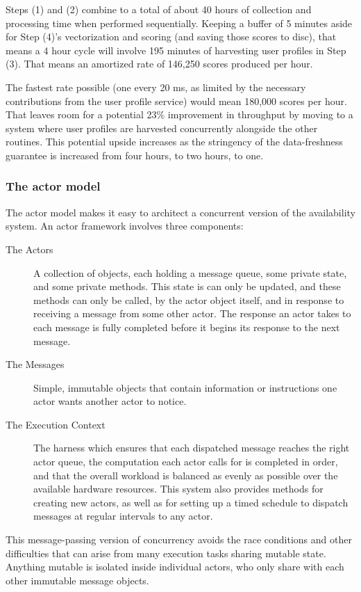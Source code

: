 \documentclass{article}
\begin{document}
 Steps (1) and (2) combine to a total of about 40 hours of collection and
processing time when performed sequentially. Keeping a buffer of 5 minutes aside
for Step (4)'s vectorization and scoring (and saving those scores to disc), that
means a 4 hour cycle will involve 195 minutes of harvesting user profiles in
Step (3). That means an amortized rate of 146,250 scores produced per hour. 

The fastest rate possible (one every 20 ms, as limited by the necessary
contributions from the user profile service) would mean 180,000 scores per
hour. That leaves room for a potential 23\% improvement in throughput
by moving to a system where user profiles are harvested concurrently
alongside the other routines. This potential upside increases as the
stringency of the data-freshness guarantee is increased from four
hours, to two hours, to one.

\subsubsection{The actor model}

The actor model makes it easy to architect a concurrent version of the
availability system. An actor framework involves three components:

\begin{description}
\item[The Actors] A collection of objects, each holding a message queue, some 
private state, and some private methods. This state is can only be updated, and
these methods can only be called, by the actor object itself, and in response to 
receiving a message from some other actor. The response an actor takes to each
message is fully completed before it begins its response to the next message.
\item[The Messages] Simple, immutable objects that contain information or 
instructions one actor wants another actor to notice. 
\item[The Execution Context] The harness which ensures that each dispatched 
message reaches the right actor queue, the computation each actor calls for is
completed in order, and that the overall workload is balanced as evenly as possible
over the available hardware resources. This system also provides methods for
creating new actors, as well as for setting up a timed schedule to dispatch
messages at regular intervals to any actor.
\end{description}

This message-passing version of concurrency avoids the race conditions and
other difficulties that can arise from many execution tasks sharing mutable state.
Anything mutable is isolated inside individual actors, who only share with each
other immutable message objects.
\end{document}
